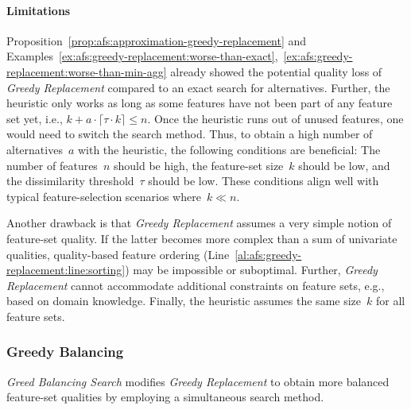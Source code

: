 \documentclass{article}
\theoremstyle{definition}
\begin{document}
\paragraph{Limitations}

Proposition~\ref{prop:afs:approximation-greedy-replacement} and Examples~\ref{ex:afs:greedy-replacement:worse-than-exact},~\ref{ex:afs:greedy-replacement:worse-than-min-agg} already showed the potential quality loss of \emph{Greedy Replacement} compared to an exact search for alternatives.
Further, the heuristic only works as long as some features have not been part of any feature set yet, i.e., $k + a \cdot \lceil \tau \cdot k \rceil \leq n$.
Once the heuristic runs out of unused features, one would need to switch the search method.
Thus, to obtain a high number of alternatives~$a$ with the heuristic, the following conditions are beneficial:
The number of features~$n$ should be high, the feature-set size~$k$ should be low, and the dissimilarity threshold~$\tau$ should be low.
These conditions align well with typical feature-selection scenarios where~$k \ll n$.

Another drawback is that \emph{Greedy Replacement} assumes a very simple notion of feature-set quality.
If the latter becomes more complex than a sum of univariate qualities, quality-based feature ordering (Line~\ref{al:afs:greedy-replacement:line:sorting}) may be impossible or suboptimal.
Further, \emph{Greedy Replacement} cannot accommodate additional constraints on feature sets, e.g., based on domain knowledge.
Finally, the heuristic assumes the same size~$k$ for all feature sets.

\subsubsection{Greedy Balancing}
\label{sec:afs:approach:univariate-heuristics:greedy-balancing}

\emph{Greed Balancing Search} modifies \emph{Greedy Replacement} to obtain more balanced feature-set qualities by employing a simultaneous search method.
\end{document}

